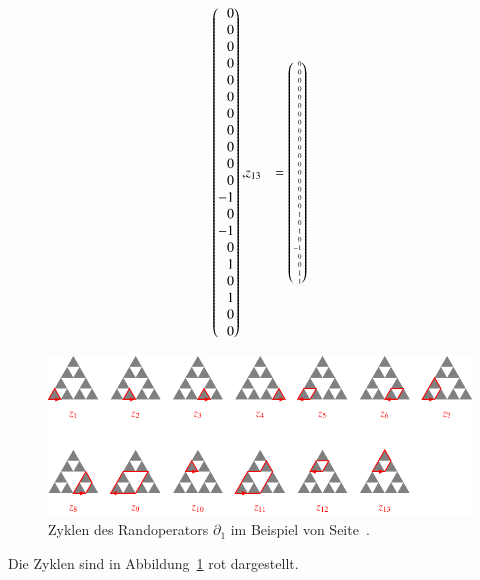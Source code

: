 \begin{beispiel}
{\begin{align*}
\begin{pmatrix*}[r]
 0\\
 0\\
 0\\ %
 0\\
 0\\
 0\\
 0\\
 0\\ %
 0\\
 0\\
 0\\
-1\\
 0\\ %
-1\\
 0\\
 1\\
 0\\
 1\\ %
 0\\
 0
\end{pmatrix*},
&z_{13} %
&=
\tiny
\begin{pmatrix*}[r]
 0\\
 0\\
 0\\
 0\\
 0\\
 0\\
 0\\
 0\\
 0\\
 0\\
 0\\
 0\\
 0\\
 0\\
 0\\
 0\\
 0\\
 0\\
 1\\
 0\\ %
 1\\
 0\\
-1\\
 0\\
 0\\ %
 1\\
 1
\end{pmatrix*}
\end{align*}
}
\begin{figure}
\centering
\includegraphics{chapters/95-homologie/images/homocycles.pdf}
\caption{Zyklen des Randoperators $\partial_1$ im Beispiel von
Seite~\pageref{buch:homologie:beispiel:gausshomo}.
\label{buch:homologie:fig:homocycles}}
\end{figure}
Die Zyklen sind in Abbildung~\ref{buch:homologie:fig:homocycles} {\color{red}rot} dargestellt.
\end{beispiel}
